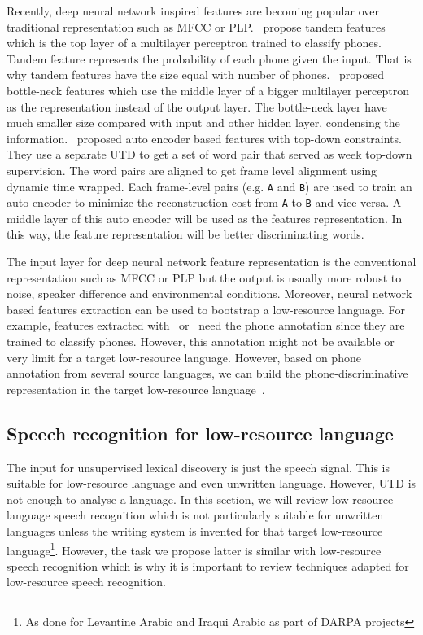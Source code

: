 \documentclass[12pt,twoside,final,hidelinks]{ltthesis}
\theoremstyle{definition}
\begin{document}
Recently, deep neural network inspired features are becoming 
popular over traditional representation such as MFCC or PLP.~ propose tandem features which is the top layer of a multilayer perceptron 
trained to classify phones. Tandem feature represents the probability of each phone given the input. That is why tandem features have the size equal with number of  
phones.~ proposed bottle-neck features which use the middle layer of a bigger multilayer perceptron as the representation instead of the 
output layer. The bottle-neck layer have much smaller size compared with input and other hidden layer, condensing the information.~ proposed auto 
encoder based features with top-down constraints. They use a separate UTD to get a set of word pair that served as week top-down supervision. 
The word pairs are aligned to get frame level alignment using dynamic time wrapped. Each frame-level pairs (e.g. \texttt{A} and \texttt{B}) are used to train an 
auto-encoder to minimize the reconstruction cost from \texttt{A} to \texttt{B} and vice versa. A middle layer of this auto encoder will be used as the features representation. In this way, the feature representation will be better discriminating words. 

The input layer for deep neural network feature representation is the conventional representation such as MFCC or PLP but the output is usually more robust to noise, speaker difference and environmental conditions. Moreover, neural network based features extraction can be used to bootstrap a low-resource language. For example, features 
extracted with~ or~ need the phone annotation since they are trained to classify phones. However, this annotation 
might not be available or very limit for a target low-resource language. However, based on phone annotation from several source languages, we can build the phone-discriminative representation in the target low-resource language~\cite{Vesely12,Stolcke06Share,ThomasMLPfeatures12}. 

\subsection{Speech recognition for low-resource language}
The input for unsupervised lexical discovery is just the speech signal. This is suitable for low-resource language and even unwritten language. 
However, UTD is not enough to analyse a language. In this section, we will review low-resource language speech recognition which is not particularly suitable for 
unwritten languages unless the writing system is invented for that target low-resource language\footnote{As done for Levantine Arabic and Iraqui Arabic as part of DARPA projects}. However, the task we propose latter is similar with low-resource speech recognition which is why it is important to review techniques adapted 
for low-resource speech recognition. 
\end{document}
